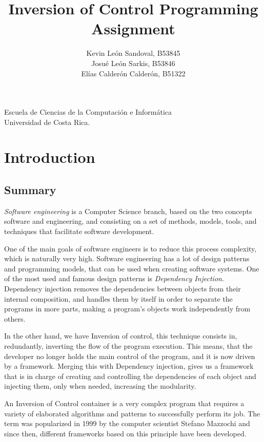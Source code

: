 \documentclass[a4paper, 12pt, notitlepage]{report}
\title{Inversion of Control Programming Assignment} %
\author{Kevin León Sandoval, B53845\\Josué León Sarkis, B53846\\Elías Calderón Calderón, B51322} %
\date{\displaydate{date}}
\begin{document}
\maketitle
\begin{center}
Escuela de Ciencias de la Computación e Informática
\\[12pt]
Universidad de Costa Rica. %
\end{center}
\thispagestyle{empty}

\newpage

\tableofcontents 



\chapter{Introduction}
%
\section{Summary}
%
\textit{Software engineering} is a Computer Science branch, based on the two concepts software and engineering, and consisting on a set of methods, models, tools, and techniques that facilitate software development. 

One of the main goals of software engineers is to reduce this process complexity, which is naturally very high. Software engineering has a lot of design patterns and programming models, that can be used when creating software systems. One of the most used and famous design patterns is \textit{Dependency Injection}. Dependency injection removes the dependencies between objects from their internal composition, and handles them by itself in order to separate the programs in more parts, making a program's objects work independently from others. 

In the other hand, we have Inversion of control, this technique consists in, redundantly, inverting the flow of the program execution. This means, that the developer no longer holds the main control of the program, and it is now driven by a framework. Merging this with Dependency injection, gives us a framework that is in charge of creating and controlling the dependencies of each object and injecting them, only when needed, increasing the modularity. 

An Inversion of Control container is a very complex program that requires a variety of elaborated algorithms and patterns to successfully perform its job. The term was popularized in 1999 by the computer scientist Stefano Mazzochi and since then, different frameworks based on this principle have been developed.
\end{document}
